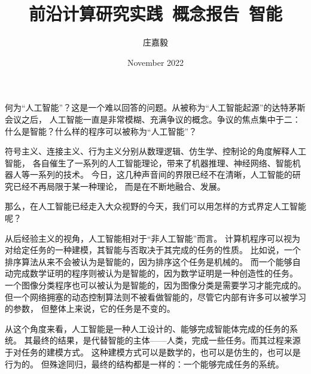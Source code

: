 \documentclass{ctexart}
\title{前沿计算研究实践~概念报告~智能}
\author{庄嘉毅}
\date{November 2022}
\begin{document}
\maketitle

何为``人工智能''？这是一个难以回答的问题。从被称为``人工智能起源''的达特茅斯会议之后，
人工智能一直是非常模糊、充满争议的概念。争议的焦点集中于二：
什么是智能？什么样的程序可以被称为``人工智能''？

符号主义、连接主义、行为主义分别从数理逻辑、仿生学、控制论的角度解释人工智能，
各自催生了一系列的人工智能理论，带来了机器推理、神经网络、智能机器人等一系列的技术。
今日，这几种声音间的界限已经不在清晰，人工智能的研究已经不再局限于某一种理论，
而是在不断地融合、发展。

那么，在人工智能已经走入大众视野的今天，我们可以用怎样的方式界定人工智能呢？

从后经验主义的视角，人工智能相对于``非人工智能''而言。
计算机程序可以视为对给定任务的一种建模，其智能与否取决于其完成的任务的性质。
比如说，一个排序算法从来不会被认为是智能的，因为排序这个任务是机械的。
而一个能够自动完成数学证明的程序则被认为是智能的，因为数学证明是一种创造性的任务。
一个图像分类程序也可以被认为是智能的，因为图像分类是需要学习才能完成的。
但一个网络拥塞的动态控制算法则不被看做智能的，尽管它内部有许多可以被学习的参数，
但整体上来说，它的任务是不变的。

从这个角度来看，人工智能是一种人工设计的、能够完成智能体完成的任务的系统。
其最终的结果，是代替智能的主体——人类，完成一些任务。而其过程来源于对任务的建模方式。
这种建模方式可以是数学的，也可以是仿生的，也可以是行为的。
但殊途同归，最终的结构都是一样的：一个能够完成任务的系统。
\end{document}
